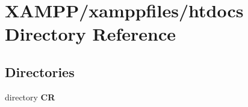 \section{X\+A\+M\+P\+P/xamppfiles/htdocs Directory Reference}
\label{dir_7d5b44e1f1028ebad312a8453712a6e4}
\subsection*{Directories}
\begin{DoxyCompactItemize}
\item 
directory {\bf C\+R}
\end{DoxyCompactItemize}
